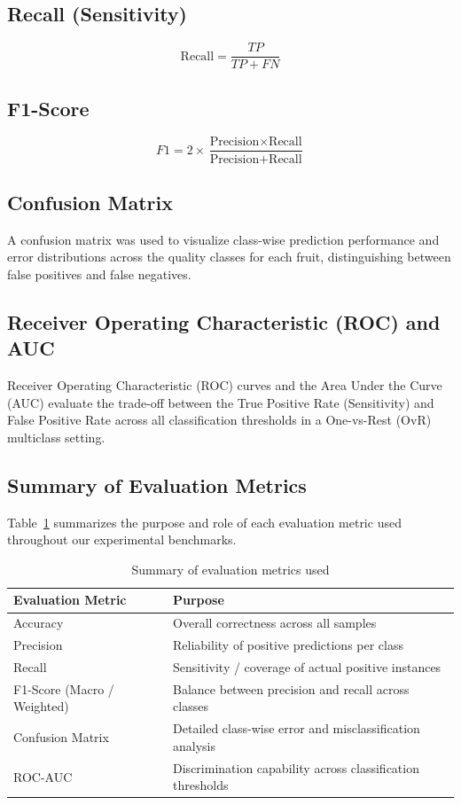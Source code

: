 \documentclass[11pt,a4paper]{article}
\begin{document}
\subsection{Recall (Sensitivity)}
\begin{equation}
    \text{Recall} = \frac{TP}{TP + FN}
\end{equation}

\subsection{F1-Score}
\begin{equation}
    F1 = 2 \times \frac{\text{Precision} \times \text{Recall}}{\text{Precision} + \text{Recall}}
\end{equation}

\subsection{Confusion Matrix}
A confusion matrix was used to visualize class-wise prediction performance and error distributions across the quality classes for each fruit, distinguishing between false positives and false negatives.

\subsection{Receiver Operating Characteristic (ROC) and AUC}
Receiver Operating Characteristic (ROC) curves and the Area Under the Curve (AUC) evaluate the trade-off between the True Positive Rate (Sensitivity) and False Positive Rate across all classification thresholds in a One-vs-Rest (OvR) multiclass setting.

\subsection{Summary of Evaluation Metrics}
Table~\ref{tab:metrics-summary} summarizes the purpose and role of each evaluation metric used throughout our experimental benchmarks.

\begin{table}[H]
\centering
\begin{tabular}{|l|p{}|}
\hline
\textbf{Evaluation Metric} & \textbf{Purpose} \\
\hline
Accuracy & Overall correctness across all samples \\ \hline
Precision & Reliability of positive predictions per class \\ \hline
Recall & Sensitivity / coverage of actual positive instances \\ \hline
F1-Score (Macro / Weighted) & Balance between precision and recall across classes \\ \hline
Confusion Matrix & Detailed class-wise error and misclassification analysis \\ \hline
ROC-AUC & Discrimination capability across classification thresholds \\ \hline
\end{tabular}
\caption{Summary of evaluation metrics used}
\label{tab:metrics-summary}
\end{table}
\end{document}
